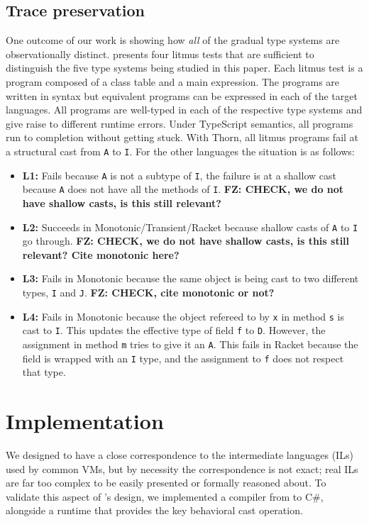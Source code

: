 \documentclass[acmlarge, anonymous, authordraft]{acmart}
\newcommand{\code}[1]{{\tt #1}\xspace}
\newcommand{\FZ}[1]{\textbf{FZ: #1}}
\begin{document}
\subsection{Trace preservation}

One outcome of our work is showing how \emph{all} of the gradual type systems
are observationally distinct.   presents four litmus tests that
are sufficient to distinguish the five type systems being studied in this
paper.  Each litmus test is a program composed of a class table and a main
expression. The programs are written in \kafka syntax but equivalent
programs can be expressed in each of the target languages. All programs are
well-typed in each of the respective type systems and give raise to
different runtime errors. Under TypeScript semantics, all programs run to
completion without getting stuck. With Thorn, all litmus programs fail at a structural cast from \code A to \code I.  For the other languages the situation is
as follows:
\begin{itemize}
\item {\bf L1:} Fails because \code A is not a subtype of \code I, the
  failure is at a shallow cast because \code A does not have all the methods of
  \code I.   \FZ{CHECK, we do not have shallow casts, is this still relevant?}
\item{\bf L2:} Succeeds in Monotonic/Transient/Racket because shallow casts
  of \code A to \code I go through. \FZ{CHECK, we do not have shallow casts, is this still relevant?  Cite monotonic here?}
\item{\bf L3:} Fails in Monotonic because the same object is being cast to
  two different types, \code I and \code J.  \FZ{CHECK, cite monotonic or not?}
\item{\bf L4:} Fails in Monotonic because the object refereed to by \code x
  in method \code s is cast to \code I. This updates the effective type of field
  \code f to \code D. However, the assignment in method \code m tries to give it
  an \code A. This fails in Racket because the \this field is wrapped with an
  \code I type, and the assignment to \code f does not respect that type.
\end{itemize}

\section{Implementation} We designed \kafka to have a close correspondence to
the intermediate languages (ILs) used by common VMs, but by necessity the
correspondence is not exact; real ILs are far too complex to be easily
presented or formally reasoned about. To validate this aspect of \kafka's
design, we implemented a compiler from \kafka to C\#, alongside a runtime that
provides the key behavioral cast operation.
\end{document}

